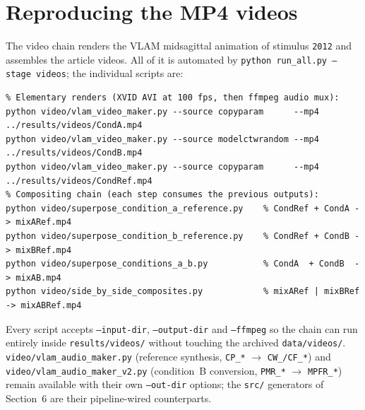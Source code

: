 \documentclass[11pt,a4paper]{article}
\begin{document}
\section{Reproducing the MP4 videos}
The video chain renders the VLAM midsagittal animation of stimulus
\texttt{2012} and assembles the article videos. All of it is automated
by \texttt{python run\_all.py --stage videos}; the individual scripts
are:
\begin{lstlisting}
% Elementary renders (XVID AVI at 100 fps, then ffmpeg audio mux):
python video/vlam_video_maker.py --source copyparam      --mp4 ../results/videos/CondA.mp4
python video/vlam_video_maker.py --source modelctwrandom --mp4 ../results/videos/CondB.mp4
python video/vlam_video_maker.py --source copyparam      --mp4 ../results/videos/CondRef.mp4
% Compositing chain (each step consumes the previous outputs):
python video/superpose_condition_a_reference.py    % CondRef + CondA -> mixARef.mp4
python video/superpose_condition_b_reference.py    % CondRef + CondB -> mixBRef.mp4
python video/superpose_conditions_a_b.py           % CondA  + CondB  -> mixAB.mp4
python video/side_by_side_composites.py            % mixARef | mixBRef -> mixABRef.mp4
\end{lstlisting}
Every script accepts \texttt{--input-dir}, \texttt{--output-dir} and
\texttt{--ffmpeg} so the chain can run entirely inside
\texttt{results/videos/} without touching the archived
\texttt{data/videos/}. \texttt{video/vlam\_audio\_maker.py} (reference
synthesis, \texttt{CP\_*} $\to$ \texttt{CW\_/CF\_*}) and
\texttt{video/vlam\_audio\_maker\_v2.py} (condition~B conversion,
\texttt{PMR\_*} $\to$ \texttt{MPFR\_*}) remain available with their own
\texttt{--out-dir} options; the \texttt{src/} generators of
Section~6 are their pipeline-wired counterparts.
\end{document}

